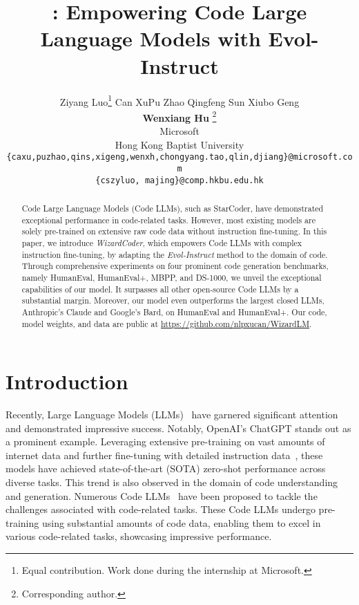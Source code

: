 \documentclass{article}
\title{\modelname{}: Empowering Code Large Language Models with Evol-Instruct}
\author{ \quad  Ziyang Luo\thanks{\quad Equal contribution. Work done during the internship at Microsoft.}  \quad Can Xu\footnotemark[1]  \quad Pu Zhao \quad Qingfeng Sun   \quad Xiubo Geng \\  {\bf Wenxiang Hu} \quad {\bf Chongyang Tao} \quad {\bf Jing Ma} \quad {\bf Qingwei Lin} \quad{\bf Daxin Jiang}\thanks{\quad  Corresponding author.
 }\\
      Microsoft\\ Hong Kong Baptist University \\ 
      \texttt{\{caxu,puzhao,qins,xigeng,wenxh,chongyang.tao,qlin,djiang\}@microsoft.com}\\
      \texttt{\{cszyluo, majing\}@comp.hkbu.edu.hk}
      }
\newcommand{\name}{\emph{Evol-Instruct}}
\newcommand{\modelname}{\emph{WizardCoder}}
\begin{document}
\maketitle
\newcommand{\todo}[1]{\textcolor{brown}{{[#1]}}}






\begin{abstract}

Code Large Language Models (Code LLMs), such as StarCoder, have demonstrated exceptional performance in code-related tasks. However, most existing models are solely pre-trained on extensive raw code data without instruction fine-tuning. In this paper, we introduce \modelname{}, which empowers Code LLMs with complex instruction fine-tuning, by adapting the \name{} method to the domain of code.
Through comprehensive experiments on four prominent code generation benchmarks, namely HumanEval, HumanEval+, MBPP, and DS-1000, we unveil the exceptional capabilities of our model. It surpasses all other open-source Code LLMs by a substantial margin. Moreover, our model even outperforms the largest closed LLMs, Anthropic’s Claude and Google’s Bard, on HumanEval and HumanEval+. Our code, model weights, and data are public at \url{https://github.com/nlpxucan/WizardLM}.

\end{abstract} \section{Introduction}

Recently, Large Language Models (LLMs)~\cite{GPT3,GPT4,PaLM,palm2,Chinchilla,gopher,GLM-130B,llama,opt} have garnered significant attention and demonstrated impressive success. Notably, OpenAI's ChatGPT stands out as a prominent example. Leveraging extensive pre-training on vast amounts of internet data and further fine-tuning with detailed instruction data~\cite{DBLP:conf/nips/Ouyang0JAWMZASR22}, these models have achieved state-of-the-art (SOTA) zero-shot performance across diverse tasks. This trend is also observed in the domain of code understanding and generation. Numerous Code LLMs~\cite{li2023starcoder,AlphaCode,codegen,CodeGeeX,incoder,codex,codet5,CodeT5+} have been proposed to tackle the challenges associated with code-related tasks. These Code LLMs undergo pre-training using substantial amounts of code data, enabling them to excel in various code-related tasks, showcasing impressive performance.
\end{document}
